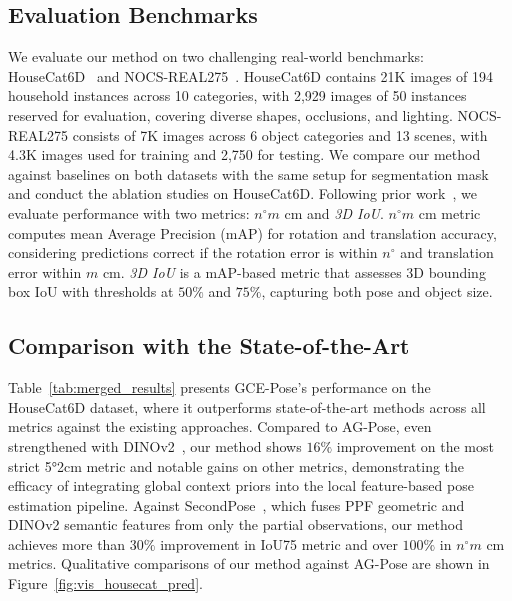 \subsection{Evaluation Benchmarks} 
 We evaluate our method on two challenging real-world benchmarks: HouseCat6D~\cite{jung2024housecat6d} and NOCS-REAL275~\cite{nocs}. HouseCat6D contains 21K images of 194 household instances across 10 categories, with 2,929 images of 50 instances reserved for evaluation, covering diverse shapes, occlusions, and lighting. NOCS-REAL275 consists of 7K images across 6 object categories and 13 scenes, with 4.3K images used for training and 2,750 for testing. We compare our method against baselines on both datasets with the same setup for segmentation mask and conduct the ablation studies on HouseCat6D.
 Following prior work~\cite{lin2024instance, chen2024secondpose, lin2023vi, di2022gpv}, we evaluate performance with two metrics:
{$n^{\circ} m$ cm} and \textit{3D IoU}. $n^{\circ} m$ cm metric computes mean Average Precision (mAP) for rotation and translation accuracy, considering predictions correct if the rotation error is within $n^{\circ}$ and translation error within $m$ cm.
\textit{3D IoU} is a  mAP-based metric that assesses 3D bounding box IoU with thresholds at $50\%$ and $75\%$, capturing both pose and object size.
\vspace{-0.2cm}
\subsection{Comparison with the State-of-the-Art} 
\label{subsec:comp_sota}
 Table~\ref{tab:merged_results} presents GCE-Pose’s performance on the HouseCat6D dataset, where it outperforms state-of-the-art methods across all metrics against the existing approaches. Compared to AG-Pose, even strengthened with DINOv2~\cite{lin2024instance}, our method shows $16\%$ improvement on the most strict 5°2cm metric and notable gains on other metrics, demonstrating the efficacy of integrating global context priors into the local feature-based pose estimation pipeline. Against SecondPose~\cite{chen2024secondpose}, which fuses PPF geometric and DINOv2 semantic features from only the partial observations, our method achieves more than $30\%$ improvement in IoU75 metric and over $100\% $ in {$n^{\circ} m$ cm} metrics. Qualitative comparisons of our method against AG-Pose are shown in Figure~\ref{fig:vis_housecat_pred}.

